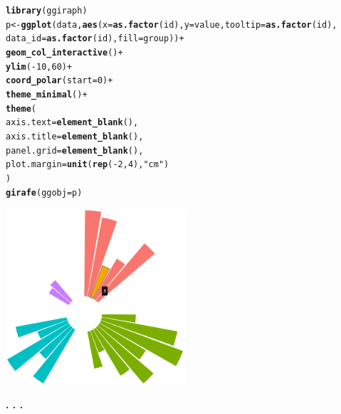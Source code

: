 \documentclass{article}\usepackage[]{graphicx}\usepackage[]{color}
\makeatletter
\newcommand{\hlnum}[1]{\textcolor[rgb]{0.686,0.059,0.569}{#1}}%
\newcommand{\hlstr}[1]{\textcolor[rgb]{0.192,0.494,0.8}{#1}}%
\newcommand{\hlopt}[1]{\textcolor[rgb]{0,0,0}{#1}}%
\newcommand{\hlstd}[1]{\textcolor[rgb]{0.345,0.345,0.345}{#1}}%
\newcommand{\hlkwb}[1]{\textcolor[rgb]{0.69,0.353,0.396}{#1}}%
\newcommand{\hlkwc}[1]{\textcolor[rgb]{0.333,0.667,0.333}{#1}}%
\newcommand{\hlkwd}[1]{\textcolor[rgb]{0.737,0.353,0.396}{\textbf{#1}}}%
\newenvironment{kframe}{%
 \def\at@end@of@kframe{}%
 \ifinner\ifhmode%
  \def\at@end@of@kframe{\end{minipage}}%
  \begin{minipage}{\columnwidth}%
 \fi\fi%
 \def\FrameCommand##1{\hskip\@totalleftmargin \hskip-\fboxsep
 \colorbox{shadecolor}{##1}\hskip-\fboxsep
     \hskip-\linewidth \hskip-\@totalleftmargin \hskip\columnwidth}%
 \MakeFramed {\advance\hsize-\width
   \@totalleftmargin\z@ \linewidth\hsize
   \@setminipage}}%
 {\par\unskip\endMakeFramed%
 \at@end@of@kframe}
\newenvironment{knitrout}{}{} %
\makeatother
\begin{document}
\begin{knitrout}
\color{fgcolor}\begin{kframe}
\begin{alltt}
\hlkwd{library}\hlstd{(ggiraph)}
\hlstd{p} \hlkwb{<-} \hlkwd{ggplot}\hlstd{(data,} \hlkwd{aes}\hlstd{(}\hlkwc{x}\hlstd{=}\hlkwd{as.factor}\hlstd{(id),} \hlkwc{y}\hlstd{=value,} \hlkwc{tooltip}\hlstd{=}\hlkwd{as.factor}\hlstd{(id),}
                      \hlkwc{data_id} \hlstd{=} \hlkwd{as.factor}\hlstd{(id),} \hlkwc{fill} \hlstd{= group))} \hlopt{+}
  \hlkwd{geom_col_interactive}\hlstd{()} \hlopt{+}
  \hlkwd{ylim}\hlstd{(}\hlopt{-}\hlnum{10}\hlstd{,}\hlnum{60}\hlstd{)} \hlopt{+}
  \hlkwd{coord_polar}\hlstd{(}\hlkwc{start} \hlstd{=} \hlnum{0}\hlstd{)} \hlopt{+}
  \hlkwd{theme_minimal}\hlstd{()} \hlopt{+}
  \hlkwd{theme}\hlstd{(}
    \hlkwc{axis.text} \hlstd{=} \hlkwd{element_blank}\hlstd{(),}
    \hlkwc{axis.title} \hlstd{=} \hlkwd{element_blank}\hlstd{(),}
    \hlkwc{panel.grid} \hlstd{=} \hlkwd{element_blank}\hlstd{(),}
    \hlkwc{plot.margin} \hlstd{=} \hlkwd{unit}\hlstd{(}\hlkwd{rep}\hlstd{(}\hlopt{-}\hlnum{2}\hlstd{,}\hlnum{4}\hlstd{),} \hlstr{"cm"}\hlstd{)}
  \hlstd{)}
\hlkwd{girafe}\hlstd{(}\hlkwc{ggobj} \hlstd{= p)}
\end{alltt}
\end{kframe}
\end{knitrout}
\vbox{
    \centering
    \includegraphics[width=0.5\textwidth]{imag/ggplot2_inte_cr}
}
\begin{center}
\textbf{. . .}
\end{center}
\end{document}

